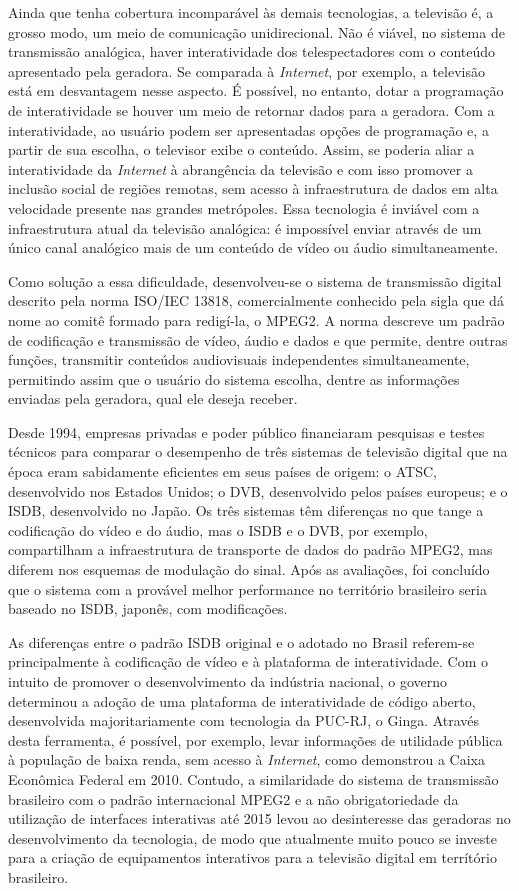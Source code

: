 \documentclass[
	12pt,				%
	openright,			%
	twoside,			%
	a4paper,			%
	brazil,
	french,				%
	english
	]{abntex2}
\begin{document}
Ainda que tenha cobertura incomparável às demais tecnologias, a televisão é, a grosso modo, um meio de comunicação
unidirecional. Não é viável, no sistema de transmissão analógica, haver interatividade dos
telespectadores com o conteúdo apresentado pela geradora. Se comparada à \textit{Internet}, por exemplo, a televisão
está em desvantagem nesse aspecto. É possível, no entanto, dotar a programação de interatividade se houver um meio de
retornar dados para a geradora. Com a interatividade, ao usuário podem ser apresentadas opções de programação e, 
a partir de sua escolha, o televisor exibe o conteúdo. Assim, se poderia aliar a interatividade da \textit{Internet}
à abrangência da televisão e com isso promover a inclusão social de regiões remotas, sem acesso à infraestrutura 
de dados em alta velocidade presente nas grandes metrópoles. Essa tecnologia é inviável com a infraestrutura atual
da televisão analógica: é impossível enviar através de um único canal analógico mais de um conteúdo de vídeo ou
áudio simultaneamente.

Como solução a essa dificuldade, desenvolveu-se
o sistema de transmissão digital descrito pela norma ISO/IEC 13818, comercialmente conhecido pela sigla que dá nome ao
comitê formado para redigí-la, o MPEG2. A norma descreve um padrão de codificação e transmissão de vídeo, áudio e dados
e que permite, dentre outras funções, transmitir conteúdos audiovisuais independentes simultaneamente, permitindo
assim que o usuário do sistema escolha, dentre as informações enviadas pela geradora, qual ele deseja receber.

Desde 1994, empresas privadas e poder público financiaram pesquisas e testes técnicos para comparar o desempenho de
três sistemas de televisão digital que na época eram sabidamente eficientes em seus países de origem: o ATSC,
desenvolvido nos Estados Unidos; o DVB, desenvolvido pelos países europeus; e o ISDB, desenvolvido no Japão. Os três
sistemas têm diferenças no que tange a codificação do vídeo e do áudio, mas o ISDB e o DVB, por exemplo, compartilham
a infraestrutura de transporte de dados do padrão MPEG2, mas diferem nos esquemas de modulação do sinal. Após as
avaliações, foi concluído que o sistema com a provável melhor performance no território brasileiro seria baseado
no ISDB, japonês, com modificações.

As diferenças entre o padrão ISDB original e o adotado no Brasil referem-se principalmente à codificação de vídeo e à
plataforma de interatividade. Com o intuito de promover o desenvolvimento da indústria nacional, o governo determinou a adoção de uma
plataforma de interatividade de código aberto, desenvolvida majoritariamente com tecnologia da PUC-RJ, o Ginga.
Através desta ferramenta, é possível, por exemplo, levar informações de utilidade pública à população de baixa renda, sem acesso
à \textit{Internet}, como demonstrou a Caixa Econômica Federal em 2010\cite{caixa}.
Contudo, a similaridade do sistema de transmissão brasileiro com o padrão internacional MPEG2 e a não
obrigatoriedade da utilização de interfaces interativas até 2015 levou ao desinteresse das geradoras no desenvolvimento da tecnologia,
de modo que atualmente muito pouco se investe para a criação de equipamentos interativos para a televisão digital em terrítório
brasileiro.
\end{document}
